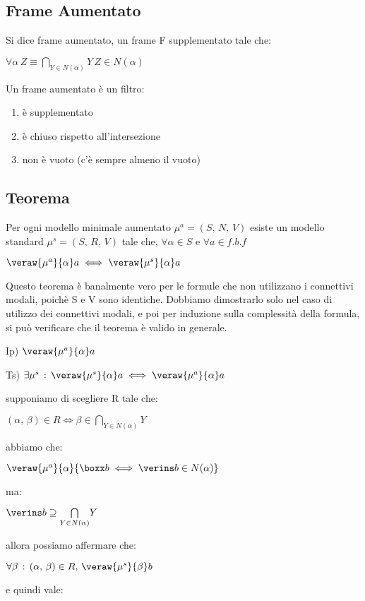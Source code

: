 \subsection{Frame Aumentato}

Si dice frame aumentato, un frame F supplementato tale che:

$\forall\alpha\, Z\equiv\underset{Y\in N(\alpha)}{\bigcap}Y\, Z\in N(\alpha)$	

Un frame aumentato è un filtro:
\begin{enumerate}
\item è supplementato
\item è chiuso rispetto all'intersezione
\item non è vuoto (c'è sempre almeno il vuoto)
\end{enumerate}

\subsection{Teorema}

Per ogni modello minimale aumentato $\mu^{a}=(S,\, N,\, V)$ esiste
un modello standard $\mu^{s}=(S,\, R,\, V)$ tale che, $\forall\alpha\in S$
e $\forall a\in f.b.f$

$\veraw{\mu^{a}}{\alpha}a\iff\veraw{\mu^{s}}{\alpha}a$

Questo teorema è banalmente vero per le formule che non utilizzano
i connettivi modali, poichè S e V sono identiche. Dobbiamo dimostrarlo
solo nel caso di utilizzo dei connettivi modali, e poi per induzione
sulla complessità della formula, si può verificare che il teorema
è valido in generale.

Ip) $\veraw{\mu^{a}}{\alpha}a$

Ts) $\exists\mu^{s}\,:\,\veraw{\mu^{s}}{\alpha}a\iff\veraw{\mu^{a}}{\alpha}a$

supponiamo di scegliere R tale che:

$(\alpha,\,\beta)\in R\iff\beta\in\underset{Y\in N(\alpha)}{\bigcap}Y$

abbiamo che:

$\veraw{\mu^{a}}{\alpha}{\boxx b\iff\verins b\in N(\alpha)}$

ma:

$\verins b\supseteq\underset{Y\in N(\alpha)}{\bigcap}Y$

allora possiamo affermare che:

$\forall\beta\,:\,(\alpha,\,\beta)\in R,\,\veraw{\mu^{s}}{\beta}b$

e quindi vale:

